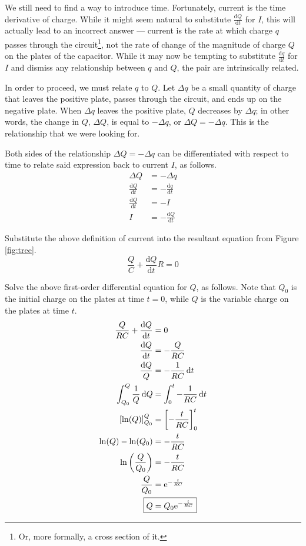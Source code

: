 \documentclass{article}
\newcommand{\dd}[2][]{\frac{\text{d}#1}{\text{d}#2}}
\newcommand{\dQ}{\text{d}Q}
\newcommand{\dt}{\text{d}t}
\newcommand{\e}[1][]{\text{e}^{#1}}
\begin{document}
We still need to find a way to introduce time. Fortunately, current is the time derivative of charge. While it might seem natural to substitute $\dd[Q]{t}$ for $I$, this will actually lead to an incorrect answer --- current is the rate at which charge $q$ passes through the circuit\footnote{Or, more formally, a cross section of it.}, not the rate of change of the magnitude of charge $Q$ on the plates of the capacitor. While it may now be tempting to substitute $\dd[q]{t}$ for $I$ and dismiss any relationship between $q$ and $Q$, the pair are intrinsically related.\par
In order to proceed, we must relate $q$ to $Q$. Let $\Delta q$ be a small quantity of charge that leaves the positive plate, passes through the circuit, and ends up on the negative plate. When $\Delta q$ leaves the positive plate, $Q$ decreases by $\Delta q$; in other words, the change in $Q$, $\Delta Q$, is equal to $-\Delta q$, or $\Delta Q = -\Delta q$. This is the relationship that we were looking for.\par
Both sides of the relationship $\Delta Q=-\Delta q$ can be differentiated with respect to time to relate said expression back to current $I$, as follows.
\begin{align*}
    \Delta Q &= -\Delta q\\
    \dd[Q]{t} &= -\dd[q]{t}\\
    \dd[Q]{t} &= -I\\
    I &= -\dd[Q]{t}
\end{align*}\par
Substitute the above definition of current into the resultant equation from Figure \ref{fig:tree}.
\begin{equation*}
    \frac{Q}{C}+\dd[Q]{t}R=0
\end{equation*}\par
Solve the above first-order differential equation for $Q$, as follows. Note that $Q_0$ is the initial charge on the plates at time $t=0$, while $Q$ is the variable charge on the plates at time $t$.
\begin{align*}
    \frac{Q}{RC}+\dd[Q]{t} &= 0\\
    \dd[Q]{t} &= -\frac{Q}{RC}\\
    \frac{\dQ}{Q} &= -\frac{1}{RC}\, \dt\\
    \int_{Q_0}^Q \frac{1}{Q}\, \dQ &= \int_0^t -\frac{1}{RC}\, \dt\\
    \left[ \ln(Q) \right]_{Q_0}^Q &= \left[ -\frac{t}{RC} \right]_0^t\\
    \ln(Q)-\ln(Q_0) &= -\frac{t}{RC}\\
    \ln\left( \frac{Q}{Q_0} \right) &= -\frac{t}{RC}\\
    \frac{Q}{Q_0} &= \e[-\frac{t}{RC}]\\
    \Aboxed{Q &= Q_0\e[-\frac{t}{RC}]}
\end{align*}
\end{document}
